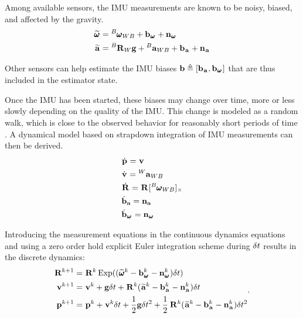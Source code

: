 Among available sensors, the IMU measurements are known to be noisy, biased, and affected by the gravity.
%
\begin{equation}
    \begin{split}
    \prescript{}{}{\widetilde{\pmb{\omega}}}_{} &= \prescript{B}{}{\pmb{\omega}}_{WB} + {\bf b}_{\prescript{}{}{\pmb{\omega}}_{}} + {\bf n}_{\prescript{}{}{\pmb{\omega}}_{}} 
    \\
    \prescript{}{}{\widetilde{{\bf a}}}_{}    &= \prescript{B}{}{{\bf R}}_{W} {\bf g} + \prescript{B}{}{{\bf a}}_{WB} + {\bf b}_{\prescript{}{}{{\bf a}}_{}} + {\bf n}_{\prescript{}{}{{\bf a}}_{}} 
    \end{split}
    \label{eq:imu_meas_model}
\end{equation}
    
Other sensors can help estimate the IMU biases ${\bf b} \triangleq [{\bf b}_{\prescript{}{}{{\bf a}}_{}}, {\bf b}_{\prescript{}{}{\pmb{\omega}}_{}}]$ that are thus included in the estimator state.


Once the IMU has been started, these biases may change over time, more or less slowly depending on the quality of the IMU. This change is modeled 
as a random walk, which is close to the observed behavior for reasonably short periods of time \cite{hussen2015low}.
A dynamical model based on strapdown integration of IMU measurements can then be derived.
%
\begin{align}
    &\dot{\prescript{}{}{{\bf p}}_{}} = \prescript{}{}{{\bf v}}_{} \\
    &\dot{\prescript{}{}{{\bf v}}_{}} = \prescript{W}{}{{\bf a}}_{WB} \\
    &\dot{\prescript{}{}{{\bf R}}_{}} = \prescript{}{}{{\bf R}}_{} [\prescript{B}{}{\pmb{\omega}}_{WB}]_{\times} \\
    &\dot{{\bf b}}_{{\bf a}} = {\bf n}_{{\bf a}} \\
    &\dot{{\bf b}}_{\prescript{}{}{\pmb{\omega}}_{}} = {\bf n}_{\prescript{}{}{\pmb{\omega}}_{}} \\
    \label{eq:imu_dyn_conti}
\end{align}

Introducing the measurement equations  in the continuous dynamics equations  and using a zero order hold
explicit Euler integration scheme during $\delta t$ results in the discrete dynamics:
%
\begin{equation}
    \begin{split}
    \prescript{}{}{{\bf R}}_{}^{k+1}  &= \prescript{}{}{{\bf R}}_{}^{k}\operatorname*{Exp}((\prescript{}{}{\widetilde{\pmb{\omega}}}_{}^k - {\bf b}_{\prescript{}{}{\pmb{\omega}}_{}}^k - {\bf n}_{\prescript{}{}{\pmb{\omega}}_{}}^k)\delta t)
    \\
    \prescript{}{}{{\bf v}}_{}^{k+1}  &= \prescript{}{}{{\bf v}}_{}^{k} + {\bf g} \delta t + \prescript{}{}{{\bf R}}_{}^{k}(\prescript{}{}{\widetilde{{\bf a}}}_{}^k - {\bf b}_{\prescript{}{}{{\bf a}}_{}}^k - {\bf n}_{\prescript{}{}{{\bf a}}_{}}^k)\delta t
    \\
    \prescript{}{}{{\bf p}}_{}^{k+1} &= \prescript{}{}{{\bf p}}_{}^{k} + \prescript{}{}{{\bf v}}_{}^{k}\delta t + \frac{1}{2}{\bf g} \delta t^2 
    + \frac{1}{2}\prescript{}{}{{\bf R}}_{}^{k}(\prescript{}{}{\widetilde{{\bf a}}}_{}^k - {\bf b}_{\prescript{}{}{{\bf a}}_{}}^k - {\bf n}_{\prescript{}{}{{\bf a}}_{}}^k)\delta t^2
    \end{split}.
    \label{eq:imu_dyn_disc}
\end{equation}
    
